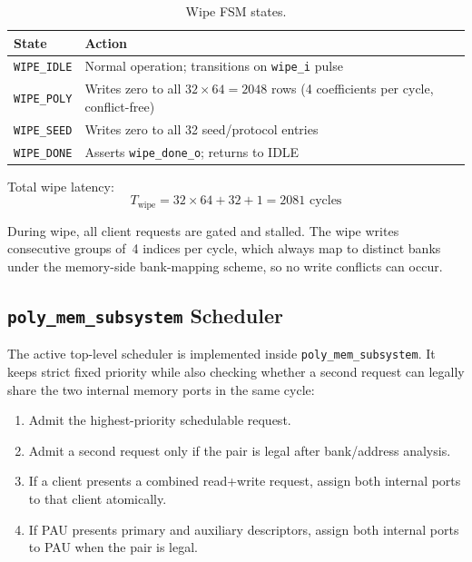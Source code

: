 \documentclass[11pt,letterpaper]{article}
\begin{document}
\begin{table}[H]
\centering
\caption{Wipe FSM states.}
\label{tab:wipe}
\begin{tabular}{@{}ll@{}}
\toprule
\textbf{State} & \textbf{Action} \\
\midrule
\texttt{WIPE\_IDLE} & Normal operation; transitions on \texttt{wipe\_i} pulse \\
\texttt{WIPE\_POLY} & Writes zero to all $32 \times 64 = 2048$ rows
                       (4 coefficients per cycle, conflict-free) \\
\texttt{WIPE\_SEED} & Writes zero to all 32 seed/protocol entries \\
\texttt{WIPE\_DONE} & Asserts \texttt{wipe\_done\_o}; returns to IDLE \\
\bottomrule
\end{tabular}
\end{table}

Total wipe latency:
\begin{equation}
  T_{\text{wipe}} = 32 \times 64 + 32 + 1 = 2081 \text{ cycles}
\end{equation}

During wipe, all client requests are gated and stalled. The wipe writes
consecutive groups of~4 indices per cycle, which always map to distinct
banks under the memory-side bank-mapping scheme, so no write conflicts can occur.

\subsection{\texttt{poly\_mem\_subsystem} Scheduler}

The active top-level scheduler is implemented inside
\texttt{poly\_mem\_subsystem}. It keeps strict fixed priority while also
checking whether a second request can legally share the two internal memory
ports in the same cycle:

\begin{enumerate}
  \item Admit the highest-priority schedulable request.
  \item Admit a second request only if the pair is legal after
    bank/address analysis.
  \item If a client presents a combined read+write request, assign both
    internal ports to that client atomically.
  \item If PAU presents primary and auxiliary descriptors, assign both
    internal ports to PAU when the pair is legal.
\end{enumerate}
\end{document}
